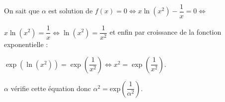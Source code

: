 \documentclass[10pt]{article}
\begin{document}
\begin{enumerate}
\begin{enumerate}
On sait que $\alpha$ est solution de $f(x) = 0 \iff x \ln \left(x^2 \right) - \dfrac1x = 0 \iff $

$ x\ln \left(x^2 \right) = \dfrac{1}{x}  \iff \ln \left(x^2\right) = \dfrac{1}{x^2}$ et enfin par croissance de la fonction exponentielle :

$\exp\left(\ln \left(x^2\right)\right) = \exp\left(\dfrac{1}{x^2}\right) \iff x^2 = \exp\left(\dfrac{1}{x^2}\right)$.

$\alpha$ vérifie cette équation donc $\alpha^2 = \text{exp} \left(\dfrac{1}{\alpha^2}\right)$.
	\end{enumerate}
\end{enumerate}

\bigskip
\end{document}
